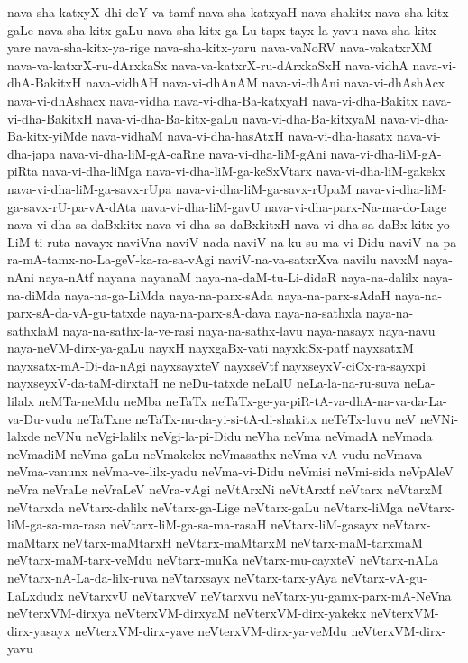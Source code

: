 {nava-sha-katxyX-dhi-deY-va-tamf
nava-sha-katxyaH
nava-shakitx
nava-sha-kitx-gaLe
nava-sha-kitx-gaLu
nava-sha-kitx-ga-Lu-tapx-tayx-la-yavu
nava-sha-kitx-yare
nava-sha-kitx-ya-rige
nava-sha-kitx-yaru
nava-vaNoRV
nava-vakatxrXM
nava-va-katxrX-ru-dArxkaSx
nava-va-katxrX-ru-dArxkaSxH
nava-vidhA
nava-vi-dhA-BakitxH
nava-vidhAH
nava-vi-dhAnAM
nava-vi-dhAni
nava-vi-dhAshAcx
nava-vi-dhAshacx
nava-vidha
nava-vi-dha-Ba-katxyaH
nava-vi-dha-Bakitx
nava-vi-dha-BakitxH
nava-vi-dha-Ba-kitx-gaLu
nava-vi-dha-Ba-kitxyaM
nava-vi-dha-Ba-kitx-yiMde
nava-vidhaM
nava-vi-dha-hasAtxH
nava-vi-dha-hasatx
nava-vi-dha-japa
nava-vi-dha-liM-gA-caRne
nava-vi-dha-liM-gAni
nava-vi-dha-liM-gA-piRta
nava-vi-dha-liMga
nava-vi-dha-liM-ga-keSxVtarx
nava-vi-dha-liM-gakekx
nava-vi-dha-liM-ga-savx-rUpa
nava-vi-dha-liM-ga-savx-rUpaM
nava-vi-dha-liM-ga-savx-rU-pa-vA-dAta
nava-vi-dha-liM-gavU
nava-vi-dha-parx-Na-ma-do-Lage
nava-vi-dha-sa-daBxkitx
nava-vi-dha-sa-daBxkitxH
nava-vi-dha-sa-daBx-kitx-yo-LiM-ti-ruta
navayx
naviVna
naviV-nada
naviV-na-ku-su-ma-vi-Didu
naviV-na-pa-ra-mA-tamx-no-La-geV-ka-ra-sa-vAgi
naviV-na-va-satxrXva
navilu
navxM
naya-nAni
naya-nAtf
nayana
nayanaM
naya-na-daM-tu-Li-didaR
naya-na-dalilx
naya-na-diMda
naya-na-ga-LiMda
naya-na-parx-sAda
naya-na-parx-sAdaH
naya-na-parx-sA-da-vA-gu-tatxde
naya-na-parx-sA-dava
naya-na-sathxla
naya-na-sathxlaM
naya-na-sathx-la-ve-rasi
naya-na-sathx-lavu
naya-nasayx
naya-navu
naya-neVM-dirx-ya-gaLu
nayxH
nayxgaBx-vati
nayxkiSx-patf
nayxsatxM
nayxsatx-mA-Di-da-nAgi
nayxsayxteV
nayxseVtf
nayxseyxV-ciCx-ra-sayxpi
nayxseyxV-da-taM-dirxtaH
ne
neDu-tatxde
neLalU
neLa-la-na-ru-suva
neLa-lilalx
neMTa-neMdu
neMba
neTaTx
neTaTx-ge-ya-piR-tA-va-dhA-na-va-da-La-va-Du-vudu
neTaTxne
neTaTx-nu-da-yi-si-tA-di-shakitx
neTeTx-luvu
neV
neVNi-lalxde
neVNu
neVgi-lalilx
neVgi-la-pi-Didu
neVha
neVma
neVmadA
neVmada
neVmadiM
neVma-gaLu
neVmakekx
neVmasathx
neVma-vA-vudu
neVmava
neVma-vanunx
neVma-ve-lilx-yadu
neVma-vi-Didu
neVmisi
neVmi-sida
neVpAleV
neVra
neVraLe
neVraLeV
neVra-vAgi
neVtArxNi
neVtArxtf
neVtarx
neVtarxM
neVtarxda
neVtarx-dalilx
neVtarx-ga-Lige
neVtarx-gaLu
neVtarx-liMga
neVtarx-liM-ga-sa-ma-rasa
neVtarx-liM-ga-sa-ma-rasaH
neVtarx-liM-gasayx
neVtarx-maMtarx
neVtarx-maMtarxH
neVtarx-maMtarxM
neVtarx-maM-tarxmaM
neVtarx-maM-tarx-veMdu
neVtarx-muKa
neVtarx-mu-cayxteV
neVtarx-nALa
neVtarx-nA-La-da-lilx-ruva
neVtarxsayx
neVtarx-tarx-yAya
neVtarx-vA-gu-LaLxdudx
neVtarxvU
neVtarxveV
neVtarxvu
neVtarx-yu-gamx-parx-mA-NeVna
neVterxVM-dirxya
neVterxVM-dirxyaM
neVterxVM-dirx-yakekx
neVterxVM-dirx-yasayx
neVterxVM-dirx-yave
neVterxVM-dirx-ya-veMdu
neVterxVM-dirx-yavu
}
